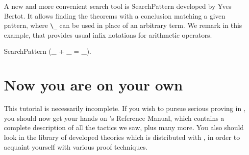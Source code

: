 \documentclass[11pt,a4paper]{book}
\begin{document}
A new and more convenient search tool is \textsf{SearchPattern}
developed by Yves Bertot. It allows finding the theorems with a
conclusion matching a given pattern, where \verb:\_: can be used in
place of an arbitrary term. We remark in this example, that \Coq{}
provides usual infix notations for arithmetic operators.

\begin{coq_example}
SearchPattern (_ + _ = _).
\end{coq_example}

\section{Now you are on your own}

This tutorial is necessarily incomplete. If you wish to pursue serious
proving in \Coq, you should now get your hands on \Coq's Reference Manual,
which contains a complete description of all the tactics we saw, 
plus many more.
You also should look in the library of developed theories which is distributed
with \Coq, in order to acquaint yourself with various proof techniques.
\end{document}

